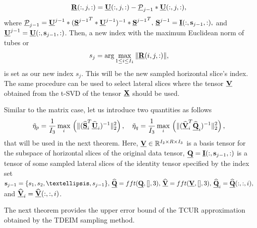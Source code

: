 \documentclass[preprint,12pt]{elsarticle}
\theoremstyle{definition}
\newcommand{\cX}{\underline{\bf X}}
\newcommand{\cQ}{\underline{\bf Q}}
\newcommand{\cU}{\underline{\bf U}}
\newcommand{\cV}{\underline{\bf V}}
\newcommand{\cS}{\underline{\bf S}}
\begin{document}
\[
\underline{\bf R}(:,j,:)=\underline{\bf U}(:,j,:)-\underline{\mathcal{P}}_{j-1}*\underline{\bf U}(:,j,:),
\]
where $\underline{\mathcal{P}}_{j-1}=\underline{\bf U}^{j-1}*({\underline{\bf S}^{j-1}}^T*\underline{{\bf U}}^{j-1})^{-1}*{\underline{\bf S}^{j-1}}^T,\,\underline{\bf S}^{j-1}=\underline{\bf I}(:,{\bf s}_{j-1},:),$ and $\underline{\bf U}^{j-1}=\underline{\bf U}(:,{\bf s}_{j-1},:)$. Then, a new index with the maximum Euclidean norm of tubes or
\[
s_j=\arg\max_{1\leq i \leq I_1}\|\underline{\bf R}(i,j,:)\|,
\]
is set as our new index $s_j$. This will be the new sampled horizontal slice's index. The same procedure can be used to select lateral slices where the tensor $\cV$ obtained from the t-SVD of the tensor $\cX$ should be used. 

Similar to the matrix case, let us introduce two quantities as follows
\begin{eqnarray}\label{t_const}
 \tilde{\eta}_p=\frac{1}{I_3}\max_{i}\,\left({\|(\widehat{\cS}^T_i\widehat{\cU}_i)^{-1}\|_2^2}\right),\quad\tilde{\eta}_q=\frac{1}{I_3}\max_{i}\,\left({\|(\widehat{\cV}^T_i\widehat{\cQ}_i)^{-1}\|_2^2}\right), 
\end{eqnarray}
 that will be used in the next theorem. Here, $\cV\in\mathbb{R}^{I_2\times R\times I_3}$ is a basis tensor for the subspace of horizontal slices of the original data tensor, $\underline{\bf Q}=\underline{\bf I}(:,{\bf s}_{j-1},:)$ is a tensor of some sampled lateral slices of the identity tensor specified by the index set ${\bf s}_{j-1}=\{s_1,s_2,\ldots,s_{j-1}\},\,\widehat{\cQ}={\rm fft}(\cQ,[],3),\,\widehat{\cV}={\rm fft}(\cV,[],3),\,\widehat{\cQ}_i=\widehat{\cQ}(:,:,i),$ and $\widehat{\cV}_i=\widehat{\cV}(:,:,i)$.   
 
The next theorem provides the upper error bound of the TCUR approximation obtained by the TDEIM sampling method.
\end{document}
